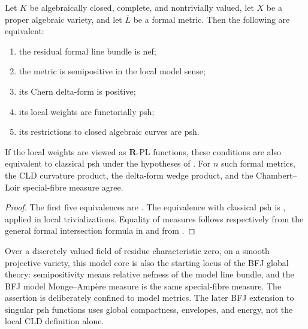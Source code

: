 \begin{theorem}\label{thm:common-model-core}
Let $K$ be algebraically closed, complete, and nontrivially valued, let
$X$ be a proper algebraic variety, and let $\overline L$ be a formal
metric.  Then the following are equivalent:
\begin{enumerate}
\item the residual formal line bundle is nef;
\item the metric is semipositive in the local model sense;
\item its Chern delta-form is positive;
\item its local weights are functorially psh;
\item its restrictions to closed algebraic curves are psh.
\end{enumerate}
If the local weights are viewed as $\mathbf R$-PL functions, these
conditions are also equivalent to classical psh under the hypotheses of
.  For $n$ such formal metrics, the CLD
curvature product, the delta-form wedge product, and the Chambert--Loir
special-fibre measure agree.
\end{theorem}
\begin{proof}
The first five equivalences are
.  The equivalence with
classical psh is , applied in local
trivializations.  Equality of measures follows respectively from
the general formal intersection formula in
 and from
.
\end{proof}

Over a discretely valued field of residue characteristic zero, on a smooth
projective variety, this model core is also the starting locus of the BFJ
global theory: semipositivity means relative nefness of the model line
bundle, and the BFJ model Monge--Amp\`ere measure is the same
special-fibre measure.  The assertion is deliberately confined to model
metrics.  The later BFJ extension to singular psh functions uses global
compactness, envelopes, and energy, not the local CLD definition alone.

